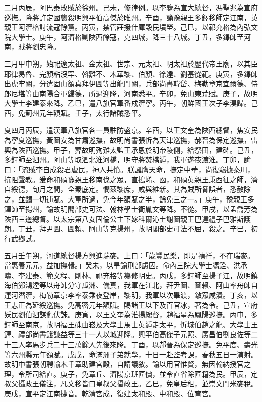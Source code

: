 \begin{pinyinscope}
二月丙辰，阿巴泰敗賊於徐州。己未，修律例。以李鑒為宣大總督，馮聖兆為宣府巡撫。降將許定國襲殺明興平伯高傑於睢州。辛酉，諭豫親王多鐸移師定江南，英親王阿濟格討流寇餘黨。丙寅，禁管莊撥什庫毀民墳塋。己巳，以祁充格為內弘文院大學士。庚午，阿濟格剿陜西餘寇，克四城，降三十八城。丁丑，多鐸師至河南，賊將劉忠降。

三月甲申朔，始祀遼太祖、金太祖、世宗、元太祖、明太祖於歷代帝王廟，以其臣耶律曷魯、完顏粘沒罕、斡離不、木華黎、伯顏、徐達、劉基從祀。庚寅，多鐸師出虎牢關，分遣固山額真拜伊圖等出龍門關，兵部尚書韓岱、梅勒章京宜爾德、侍郎尼堪等由南陽合軍歸德，所過迎降，河南悉平。辛卯，免山東荒賦。庚子，故明大學士李建泰來降。乙巳，遣八旗官軍番戍濟寧。丙午，朝鮮國王次子李淏歸。己酉，免薊州元年額賦。壬子，太行諸賊悉平。

夏四月丙辰，遣漢軍八旗官各一員駐防盛京。辛酉，以王文奎為陜西總督，焦安民為寧夏巡撫，黃圖安為甘肅巡撫，故明尚書張忻為天津巡撫，郝晉為保定巡撫，雷興為陜西巡撫。甲子，葬故明殉難太監王承恩於明帝陵側，給祭田，建碑。己丑，多鐸師至泗州。阿山等取泗北淮河橋，明守將焚橋遁，我軍遂夜渡淮。丁卯，諭曰：「流賊李自成殺君虐民，神人共憤。朕誕膺天命，撫定中華，尚復竊據秦川，抗阻聲教。爰命和碩豫親王移南伐之眾，直搗崤、函，和碩英親王秉西征之師，濟自綏德，旬月之間，全秦底定。憫茲黎庶，咸與維新。其為賊所脅誤者，悉赦除之，並蠲一切逋賦。大軍所過，免今年額賦之半，餘免三之一。」庚午，豫親王多鐸師至揚州，諭故明閣部史可法、翰林學士衛胤文等降。不從。甲戌，以孟喬芳為陜西三邊總督。以太宗第八女固倫公主下嫁科爾沁土謝圖親王巴達禮子巴雅斯護朗。丁丑，拜尹圖、圖賴、阿山等克揚州，故明閣部史可法不屈，殺之。辛巳，初行武鄉試。

五月壬午朔，河道總督楊方興進瑞麥。上曰：「歲豐民樂，即是禎祥，不在瑞麥。當惠養元元，益加撫輯。」癸未，以旱諭刑部慮囚。命內三院大學士馮銓、洪承疇、李建泰、範文程、剛林、祁充格等纂修明史。丙戌，多鐸師至揚子江，故明鎮海伯鄭鴻逵等以舟師分守瓜洲、儀真，我軍在江北，拜尹圖、圖賴、阿山率舟師自運河潛濟，梅勒章京李率泰乘夜登岸，黎明，我軍以次畢渡，敵眾咸潰。丁亥，以王志正為延綏巡撫。免高密元年額賦。賜諸王以下及百官冰，著為令。己丑，宣府妖民劉伯泗謀亂伏誅。庚寅，以王文奎為淮揚總督，趙福星為鳳陽巡撫。丙申，多鐸師至南京，故明福王硃由崧及大學士馬士英遁走太平，忻城伯趙之龍、大學士王鐸、禮部尚書錢謙益等三十一人以城迎降。興平伯高傑子元照、廣昌伯劉良佐等二十三人率馬步兵二十三萬餘人先後來降。丁酉，以郝晉為保定巡撫。免平度、壽光等六州縣元年額賦。戊戌，命滿洲子弟就學，十日一赴監考課，春秋五日一演射。故明中書張朝聘輸木千章助建宮殿，自請議敘。諭以用官惟賢，無因輸納授官之理，令所司給直。庚子，免章丘、濟陽京班匠價，並令直省除匠籍為民。甲辰，定叔父攝政王儀注，凡文移皆曰皇叔父攝政王。乙巳，免皇后租，並崇文門米麥稅。庚戌，宣平定江南捷音。乾清宮成，復建太和殿、中和殿、位育宮。


\end{pinyinscope}
